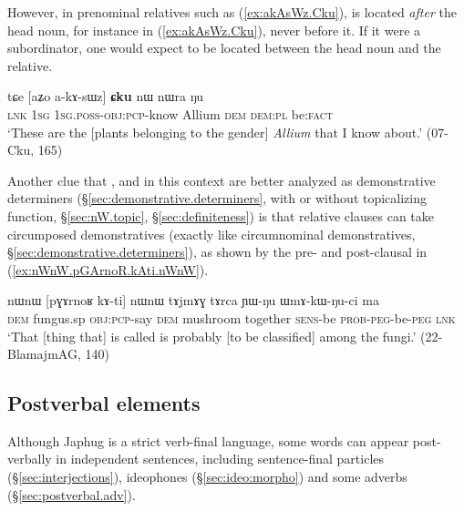 However, in prenominal relatives such as (\ref{ex:akAsWz.Cku}),  is located \textit{after} the head noun, for instance  in (\ref{ex:akAsWz.Cku}), never before it. If it were a subordinator, one would expect  to be located between the head noun and the relative.

\begin{exe}
\ex \label{ex:akAsWz.Cku}
\gll   tɕe [aʑo a-kɤ-sɯz] \textbf{ɕku} nɯ nɯra ŋu \\
\textsc{lnk} \textsc{1sg} \textsc{1sg}.\textsc{poss}-\textsc{obj}:\textsc{pcp}-know Allium \textsc{dem} \textsc{dem}:\textsc{pl} be:\textsc{fact} \\
\glt `These are the [plants belonging to the gender] \textit{Allium} that I know about.' (07-Cku, 165)
\end{exe}  

Another clue that ,  and  in this context are better analyzed as demonstrative determiners (§\ref{sec:demonstrative.determiners}, with or without topicalizing function, §\ref{sec:nW.topic}, §\ref{sec:definiteness}) is that relative clauses can take circumposed demonstratives (exactly like circumnominal demonstratives, §\ref{sec:demonstrative.determiners}), as shown by the pre- and post-clausal  in (\ref{ex:nWnW.pGArnoR.kAti.nWnW}).

\begin{exe}
\ex \label{ex:nWnW.pGArnoR.kAti.nWnW}
\gll nɯnɯ [pɣɤrnoʁ kɤ-ti] nɯnɯ tɤjmɤɣ tɤrca ɲɯ-ŋu ɯmɤ-kɯ-ŋu-ci ma \\
\textsc{dem} fungus.sp \textsc{obj}:\textsc{pcp}-say \textsc{dem} mushroom together \textsc{sens}-be \textsc{prob}-\textsc{peg}-be-\textsc{peg} \textsc{lnk} \\
\glt `That [thing that] is called  is probably [to be classified] among the fungi.' (22-BlamajmAG, 140)
\end{exe}  

\subsection{Postverbal elements} \label{sec:relative.postverbal}
Although Japhug is a strict verb-final language, some words can appear post-verbally in independent sentences, including sentence-final particles (§\ref{sec:interjections}), ideophones (§\ref{sec:ideo:morpho}) and some adverbs (§\ref{sec:postverbal.adv}).

